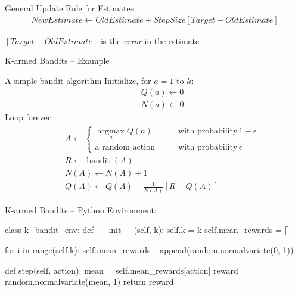 \documentclass[ignorenonframetext,xcolor=x11names]{beamer}
\begin{document}
\begin{frame}{General Update Rule for Estimates}
\begin{align*}
NewEstimate \leftarrow OldEstimate + StepSize \left[ Target - OldEstimate \right]
\end{align*}

\vspace{\baselineskip}
$\left[ Target - OldEstimate \right]$ is the \emph{error} in the estimate
\end{frame}

\begin{frame}{K-armed Bandits -- Example}
\begin{block}{A simple bandit algorithm}
Initialize, for $a=1$ to $k$:
\begin{align*}
&\quad Q(a) \leftarrow 0 \\
&\quad N(a) \leftarrow 0
\end{align*}
Loop forever:
\begin{align*}
&\quad A \leftarrow \begin{cases} \operatorname*{arg max}_a Q(a) &\qquad \text{with probability}\, 1-\epsilon \\
\text{a random action} &\qquad \text{with probability}
\, \epsilon
\end{cases} \\
&\quad R \leftarrow \operatorname{bandit}(A) \\
&\quad N(A) \leftarrow N(A) + 1 \\
&\quad Q(A) \leftarrow Q(A) + \frac{1}{N(A)} \left[ R - Q(A) \right]
\end{align*}
\end{block}
\end{frame}

\begin{frame}[fragile]{K-armed Bandits -- Python}
Environment:
\begin{pythoncode}
class k_bandit_env:
    def __init__(self, k):
        self.k = k
        self.mean_rewards = []

        for i in range(self.k):
            self.mean_rewards \
                .append(random.normalvariate(0, 1))

    def step(self, action):
        mean = self.mean_rewards[action]
        reward = random.normalvariate(mean, 1)
        return reward
\end{pythoncode}
\end{frame}
\end{document}
